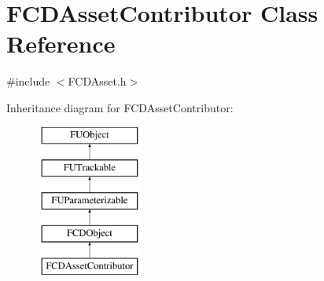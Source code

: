 \hypertarget{classFCDAssetContributor}{
\section{FCDAssetContributor Class Reference}
\label{classFCDAssetContributor}
}


{\ttfamily \#include $<$FCDAsset.h$>$}

Inheritance diagram for FCDAssetContributor:\begin{figure}[H]
\begin{center}
\leavevmode
\includegraphics[height=5.000000cm]{classFCDAssetContributor}
\end{center}
\end{figure}

